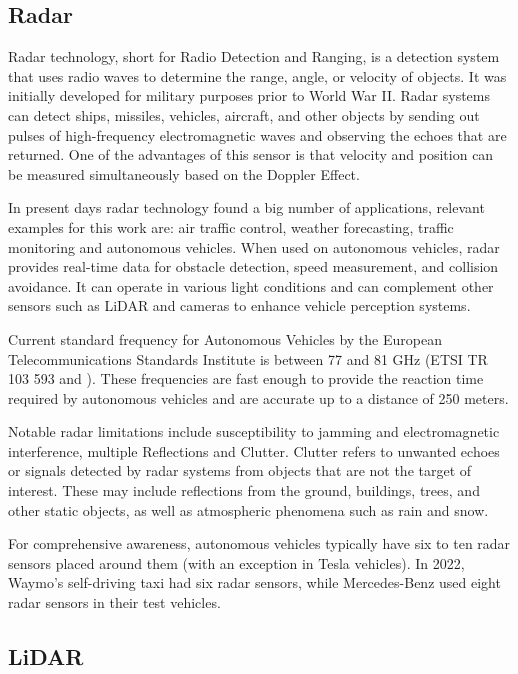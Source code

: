 \subsection{Radar}

Radar technology, short for Radio Detection and Ranging, is a detection system that uses radio waves to determine the range, angle, or velocity of objects. It was initially developed for military purposes prior to World War II. Radar systems can detect ships, missiles, vehicles, aircraft, and other objects by sending out pulses of high-frequency electromagnetic waves and observing the echoes that are returned. One of the advantages of this sensor is that velocity and position can be measured simultaneously based on the Doppler Effect.

In present days radar technology found a big number of applications, relevant examples for this work are: air traffic control, weather forecasting, traffic monitoring and autonomous vehicles. When used on autonomous vehicles, radar provides real-time data for obstacle detection, speed measurement, and collision avoidance. It can operate in various light conditions and can complement other sensors such as LiDAR and cameras to enhance vehicle perception systems.

Current standard frequency for Autonomous Vehicles by the European Telecommunications Standards Institute is between 77 and 81 GHz (ETSI TR 103 593 and \cite{ramasubramanian2018moving}). These frequencies are fast enough to provide the reaction time required by autonomous vehicles and are accurate up to a distance of 250 meters.

Notable radar limitations include susceptibility to jamming and electromagnetic interference, multiple Reflections and Clutter. Clutter refers to unwanted echoes or signals detected by radar systems from objects that are not the target of interest. These may include reflections from the ground, buildings, trees, and other static objects, as well as atmospheric phenomena such as rain and snow.

For comprehensive awareness, autonomous vehicles typically have six to ten radar sensors placed around them (with an exception in Tesla vehicles). In 2022, Waymo's self-driving taxi had six radar sensors, while Mercedes-Benz used eight radar sensors in their test vehicles.

\subsection{LiDAR}


